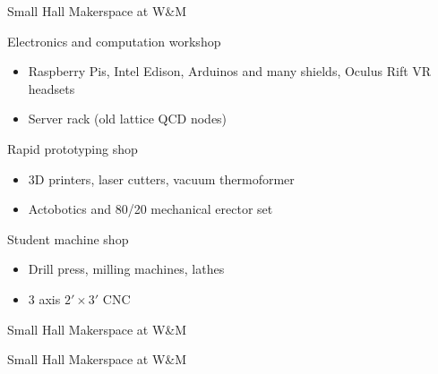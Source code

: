 \documentclass[xcolor=table,compress,professionalfonts,pdfpagelabels]{beamer}
\begin{document}
\begin{frame}{Small Hall Makerspace at W\&M}
 \begin{block}{Electronics and computation workshop}
  \begin{itemize}
   \item Raspberry Pis, Intel Edison, Arduinos and many shields, Oculus Rift VR headsets
   \item Server rack (old lattice QCD nodes)
  \end{itemize}
 \end{block}
 \begin{block}{Rapid prototyping shop}
  \begin{itemize}
   \item 3D printers, laser cutters, vacuum thermoformer
   \item Actobotics and 80/20 mechanical erector set
  \end{itemize}
 \end{block}
 \begin{block}{Student machine shop}
  \begin{itemize}
   \item Drill press, milling machines, lathes
   \item 3 axis $2' \times 3'$ CNC
  \end{itemize}
 \end{block}
\end{frame}

\begin{frame}{Small Hall Makerspace at W\&M}
\end{frame}

\begin{frame}{Small Hall Makerspace at W\&M}
\end{frame}
\end{document}
